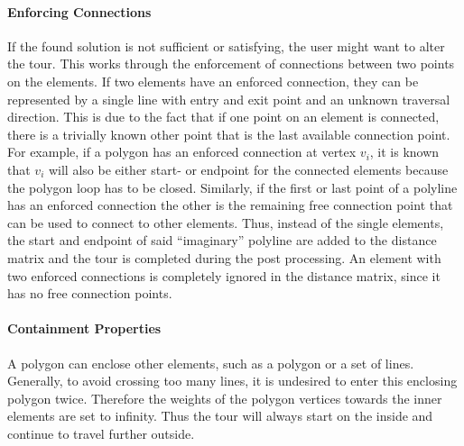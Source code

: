 \paragraph{Enforcing Connections} If the found solution is not sufficient or satisfying, the user might want to alter the tour. This works through the enforcement of connections between two points on the elements. If two elements have an enforced connection, they can be represented by a single line with entry and exit point and an unknown traversal direction. This is due to the fact that if one point on an element is connected, there is a trivially known other point that is the last available connection point. For example, if a polygon has an enforced connection at vertex $v_i$, it is known that $v_i$ will also be either start- or endpoint for the connected elements because the polygon loop has to be closed. Similarly, if the first or last point of a polyline has an enforced connection the other is the remaining free connection point that can be used to connect to other elements. Thus, instead of the single elements, the start and endpoint of said \enquote{imaginary} polyline are added to the distance matrix and the tour is completed during the post processing. An element with two enforced connections is completely ignored in the distance matrix, since it has no free connection points.

\paragraph{Containment Properties}

A polygon can enclose other elements, such as a polygon or a set of lines. Generally, to avoid crossing too many lines, it is undesired to enter this enclosing polygon twice. Therefore the weights of the polygon vertices towards the inner elements are set to infinity. Thus the tour will always start on the inside and continue to travel further outside.

